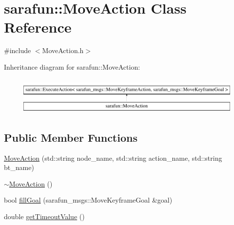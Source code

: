 \hypertarget{classsarafun_1_1MoveAction}{\section{sarafun\-:\-:Move\-Action Class Reference}
\label{classsarafun_1_1MoveAction}
}


{\ttfamily \#include $<$Move\-Action.\-h$>$}

Inheritance diagram for sarafun\-:\-:Move\-Action\-:\begin{figure}[H]
\begin{center}
\leavevmode
\includegraphics[height=1.914530cm]{classsarafun_1_1MoveAction}
\end{center}
\end{figure}
\subsection*{Public Member Functions}
\begin{DoxyCompactItemize}
\item 
\hyperlink{classsarafun_1_1MoveAction_a423d16aa9d5a47e9f558eae9e013c5e7}{Move\-Action} (std\-::string node\-\_\-name, std\-::string action\-\_\-name, std\-::string bt\-\_\-name)
\item 
\hyperlink{classsarafun_1_1MoveAction_ab9b7f0e483bd9a0b53f9651d661c93b7}{$\sim$\-Move\-Action} ()
\item 
bool \hyperlink{classsarafun_1_1MoveAction_ad5259389b6a5718389c24fab920c9296}{fill\-Goal} (sarafun\-\_\-msgs\-::\-Move\-Keyframe\-Goal \&goal)
\item 
double \hyperlink{classsarafun_1_1MoveAction_a3a0d4d2919b30b878c603a884db6a470}{get\-Timeout\-Value} ()
\end{DoxyCompactItemize}


